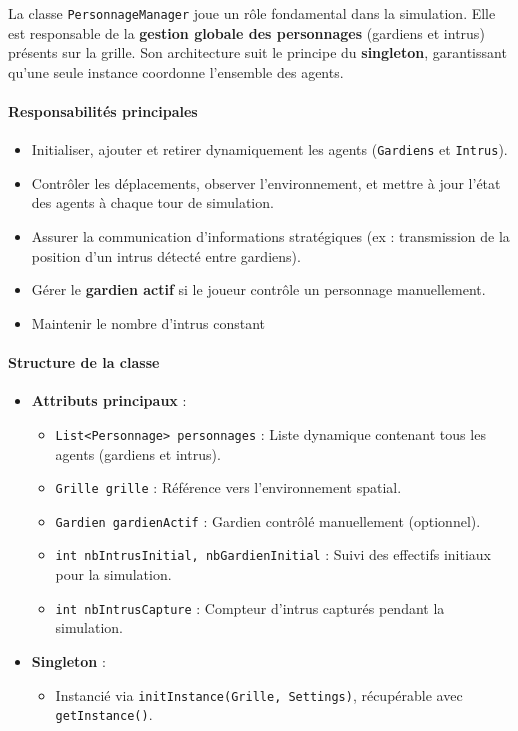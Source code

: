 La classe \texttt{PersonnageManager} joue un rôle fondamental dans la simulation. Elle est responsable de la \textbf{gestion globale des personnages} (gardiens et intrus) présents sur la grille. Son architecture suit le principe du \textbf{singleton}, garantissant qu’une seule instance coordonne l’ensemble des agents.

\vspace{1em}
\paragraph{Responsabilités principales}
\begin{itemize}
    \item Initialiser, ajouter et retirer dynamiquement les agents (\texttt{Gardiens} et \texttt{Intrus}).
    \item Contrôler les déplacements, observer l'environnement, et mettre à jour l’état des agents à chaque tour de simulation.
    \item Assurer la communication d’informations stratégiques (ex : transmission de la position d’un intrus détecté entre gardiens).
    \item Gérer le \textbf{gardien actif} si le joueur contrôle un personnage manuellement.
    \item Maintenir le nombre d’intrus constant 
\end{itemize}

\vspace{1em}
\paragraph{Structure de la classe}
\begin{itemize}
    \item \textbf{Attributs principaux} :
    \begin{itemize}
        \item \texttt{List<Personnage> personnages} : Liste dynamique contenant tous les agents (gardiens et intrus).
        \item \texttt{Grille grille} : Référence vers l’environnement spatial.
        \item \texttt{Gardien gardienActif} : Gardien contrôlé manuellement (optionnel).
        \item \texttt{int nbIntrusInitial, nbGardienInitial} : Suivi des effectifs initiaux pour la simulation.
        \item \texttt{int nbIntrusCapture} : Compteur d’intrus capturés pendant la simulation.
    \end{itemize}
    \item \textbf{Singleton} :
    \begin{itemize}
        \item Instancié via \texttt{initInstance(Grille, Settings)}, récupérable avec \texttt{getInstance()}.
    \end{itemize}
\end{itemize}

